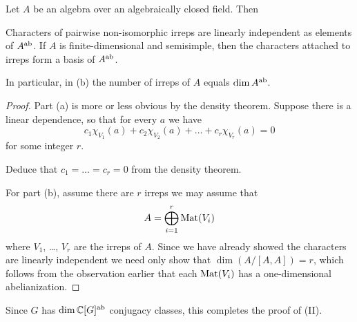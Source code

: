 \begin{theorem}
	Let $A$ be an algebra over an algebraically closed field. Then
	\begin{enumerate}[(a)]
		\ii Characters of pairwise non-isomorphic irreps are
		linearly independent as elements of $A^\text{ab}$.
		\ii If $A$ is finite-dimensional and semisimple,
		then the characters attached to irreps
		form a basis of $A^\text{ab}$.
	\end{enumerate}
	In particular, in (b) the number of irreps of $A$ equals $\dim A^\text{ab}$.
\end{theorem}
\begin{proof}
	Part (a) is more or less obvious by the density theorem.
	Suppose there is a linear dependence, so that for every $a$ we have
	\[ c_1 \chi_{V_1}(a) + c_2 \chi_{V_2}(a) + \dots + c_r \chi_{V_r} (a) = 0\]
	for some integer $r$.
	\begin{ques}
		Deduce that $c_1 = \dots = c_r = 0$ from the density theorem.
	\end{ques}
	For part (b), assume there are $r$ irreps
	we may assume that \[ A = \bigoplus_{i=1}^r \mathrm{Mat}(V_i) \]
	where $V_1$, \dots, $V_r$ are the irreps of $A$.
	Since we have already showed the characters are linearly independent
	we need only show that $\dim ( A / [A,A] ) = r$,
	which follows from the observation earlier that each $\mathrm{Mat}(V_i)$
	has a one-dimensional abelianization.
\end{proof}
Since $G$ has $\dim \mathbb C[G]^\text{ab}$ conjugacy classes,
this completes the proof of (II).

